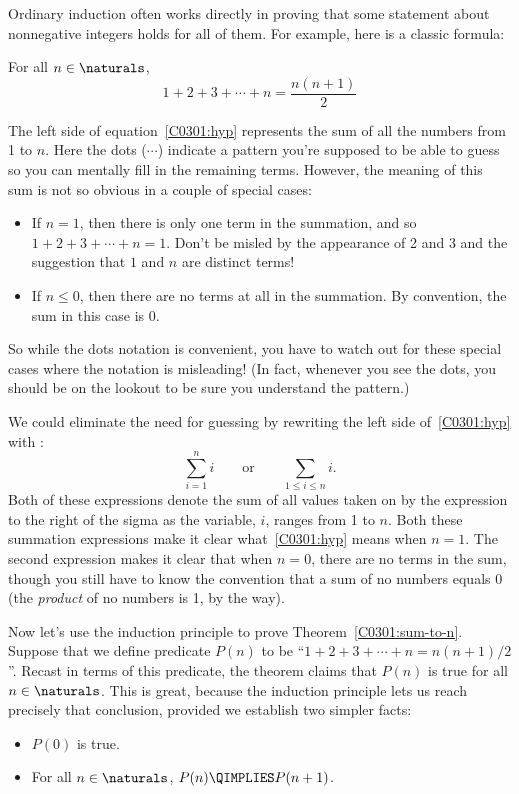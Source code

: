 Ordinary induction often works directly in proving that some statement
about nonnegative integers holds for all of them.  For example, here is a
classic formula:

\begin{theorem}
\label{C0301:sum-to-n}
For all $n \in \naturals$,
\begin{equation}\label{C0301:hyp}
1 + 2 + 3 + \cdots + n = \frac{n(n+1)}{2}
\end{equation}
\end{theorem}

The left side of equation~\eqref{C0301:hyp} represents the sum of all the
numbers from 1 to $n$.  Here the dots ($\cdots$) indicate a pattern you're
supposed to be able to guess so you can mentally fill in the remaining
terms. However, the meaning of this sum is not so obvious in a couple of 
special cases:
%
\begin{itemize}
%
\item If $n = 1$, then there is only one term in the summation, and so
$1 + 2 + 3 + \cdots + n = 1$.  Don't be misled by the appearance of 2
and 3 and the suggestion that $1$ and $n$ are distinct terms!
%
\item If $n \leq 0$, then there are no terms at all in the summation.  By
convention, the sum in this case is 0.
%
\end{itemize}
%
So while the dots notation is convenient, you have to watch out for these
special cases where the notation is misleading!  (In fact, whenever you
see the dots, you should be on the lookout to be sure you understand the
pattern.)

We could eliminate the need for guessing by rewriting the left side
of~\eqref{C0301:hyp} with :
\[
\sum_{i=1}^n i
\qquad \text{or} \qquad
\sum_{1 \leq i \leq n} i.
\]
Both of these expressions denote the sum of all values taken on by the
expression to the right of the sigma as the variable, $i$, ranges from 
1 to $n$.  Both these summation expressions make it clear 
what~\eqref{C0301:hyp} means when $n=1$.  The second expression makes 
it clear that when $n=0$, there are no terms in the sum, though you 
still have to know the convention that a sum of no numbers equals 0 
(the \emph{product} of no numbers is 1, by the way).

Now let's use the induction principle to prove Theorem~\ref{C0301:sum-to-n}.
Suppose that we define predicate $P(n)$ to be ``$1 + 2 + 3 + \cdots + n =
n(n+1)/2$''.  Recast in terms of this predicate, the theorem claims that
$P(n)$ is true for all $n \in \naturals$.  This is great, because the
induction principle lets us reach precisely that conclusion, provided we
establish two simpler facts:
%
\begin{itemize}
\item $P(0)$ is true.
\item For all $n \in \naturals$, $P(n) \QIMPLIES P(n+1)$.
\end{itemize}

